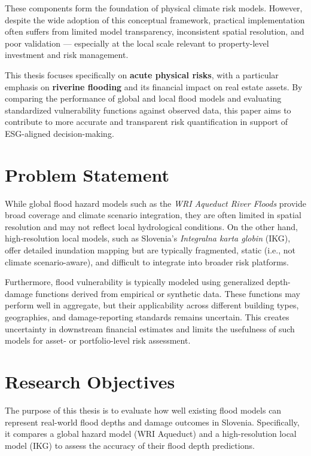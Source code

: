 These components form the foundation of physical climate risk models. However, despite the wide adoption of this conceptual framework, practical implementation often suffers from limited model transparency, inconsistent spatial resolution, and poor validation — especially at the local scale relevant to property-level investment and risk management.

This thesis focuses specifically on \textbf{acute physical risks}, with a particular emphasis on \textbf{riverine flooding} and its financial impact on real estate assets. By comparing the performance of global and local flood models and evaluating standardized vulnerability functions against observed data, this paper aims to contribute to more accurate and transparent risk quantification in support of ESG-aligned decision-making.


\section{Problem Statement}

While global flood hazard models such as the \textit{WRI Aqueduct River Floods} provide broad coverage and climate scenario integration, they are often limited in spatial resolution and may not reflect local hydrological conditions. On the other hand, high-resolution local models, such as Slovenia’s \textit{Integralna karta globin} (IKG), offer detailed inundation mapping but are typically fragmented, static (i.e., not climate scenario-aware), and difficult to integrate into broader risk platforms.

Furthermore, flood vulnerability is typically modeled using generalized depth-damage functions derived from empirical or synthetic data. These functions may perform well in aggregate, but their applicability across different building types, geographies, and damage-reporting standards remains uncertain. This creates uncertainty in downstream financial estimates and limits the usefulness of such models for asset- or portfolio-level risk assessment.

\section{Research Objectives}

The purpose of this thesis is to evaluate how well existing flood models can represent real-world flood depths and damage outcomes in Slovenia. Specifically, it compares a global hazard model (WRI Aqueduct) and a high-resolution local model (IKG) to assess the accuracy of their flood depth predictions.


